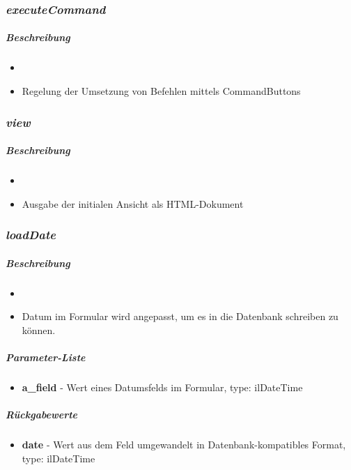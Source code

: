 \subsubsection*{\textit{executeCommand}}\label{executeCommandGGUI}
\subparagraph{Beschreibung}
\begin{itemize}
	\item[] \noindent{}
	\item[] Regelung der Umsetzung von Befehlen mittels CommandButtons
\end{itemize}

\subsubsection*{\textit{view}}\label{viewGGUI}
\subparagraph{Beschreibung}
\begin{itemize}
	\item[] \noindent{}
	\item[] Ausgabe der initialen Ansicht als HTML-Dokument
\end{itemize}

\subsubsection*{\textit{loadDate}}\label{loadDateGGUI}
\subparagraph{Beschreibung}
\begin{itemize}
	\item[] \noindent{}
	\item[] Datum im Formular wird angepasst, um es in die Datenbank schreiben zu können.
\end{itemize}
\subparagraph{Parameter-Liste}
\begin{itemize}
	\item[] \textbf{a\_field} - Wert eines Datumsfelds im Formular, type: ilDateTime
\end{itemize}
\subparagraph{Rückgabewerte}
\begin{itemize}
	\item[] \textbf{date} - Wert aus dem Feld umgewandelt in Datenbank-kompatibles Format, type: ilDateTime
\end{itemize}

